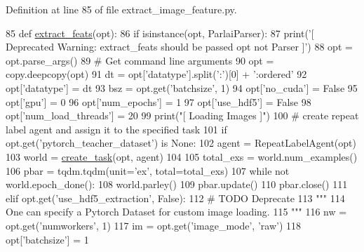 Definition at line 85 of file extract\+\_\+image\+\_\+feature.\+py.


\begin{DoxyCode}
85 \textcolor{keyword}{def }\hyperlink{namespaceparlai_1_1scripts_1_1extract__image__feature_a6e3b12d361756ec79fbd44abd185387b}{extract\_feats}(opt):
86     \textcolor{keywordflow}{if} isinstance(opt, ParlaiParser):
87         print(\textcolor{stringliteral}{'[ Deprecated Warning: extract\_feats should be passed opt not Parser ]'})
88         opt = opt.parse\_args()
89     \textcolor{comment}{# Get command line arguments}
90     opt = copy.deepcopy(opt)
91     dt = opt[\textcolor{stringliteral}{'datatype'}].split(\textcolor{stringliteral}{':'})[0] + \textcolor{stringliteral}{':ordered'}
92     opt[\textcolor{stringliteral}{'datatype'}] = dt
93     bsz = opt.get(\textcolor{stringliteral}{'batchsize'}, 1)
94     opt[\textcolor{stringliteral}{'no\_cuda'}] = \textcolor{keyword}{False}
95     opt[\textcolor{stringliteral}{'gpu'}] = 0
96     opt[\textcolor{stringliteral}{'num\_epochs'}] = 1
97     opt[\textcolor{stringliteral}{'use\_hdf5'}] = \textcolor{keyword}{False}
98     opt[\textcolor{stringliteral}{'num\_load\_threads'}] = 20
99     print(\textcolor{stringliteral}{"[ Loading Images ]"})
100     \textcolor{comment}{# create repeat label agent and assign it to the specified task}
101     \textcolor{keywordflow}{if} opt.get(\textcolor{stringliteral}{'pytorch\_teacher\_dataset'}) \textcolor{keywordflow}{is} \textcolor{keywordtype}{None}:
102         agent = RepeatLabelAgent(opt)
103         world = \hyperlink{namespaceparlai_1_1core_1_1worlds_a11923c10b545c7ecc1b08fe2242d9c2c}{create\_task}(opt, agent)
104 
105         total\_exs = world.num\_examples()
106         pbar = tqdm.tqdm(unit=\textcolor{stringliteral}{'ex'}, total=total\_exs)
107         \textcolor{keywordflow}{while} \textcolor{keywordflow}{not} world.epoch\_done():
108             world.parley()
109             pbar.update()
110         pbar.close()
111     \textcolor{keywordflow}{elif} opt.get(\textcolor{stringliteral}{'use\_hdf5\_extraction'}, \textcolor{keyword}{False}):
112         \textcolor{comment}{# TODO Deprecate}
113         \textcolor{stringliteral}{"""}
114 \textcolor{stringliteral}{        One can specify a Pytorch Dataset for custom image loading.}
115 \textcolor{stringliteral}{        """}
116         nw = opt.get(\textcolor{stringliteral}{'numworkers'}, 1)
117         im = opt.get(\textcolor{stringliteral}{'image\_mode'}, \textcolor{stringliteral}{'raw'})
118         opt[\textcolor{stringliteral}{'batchsize'}] = 1

\end{DoxyCode}

